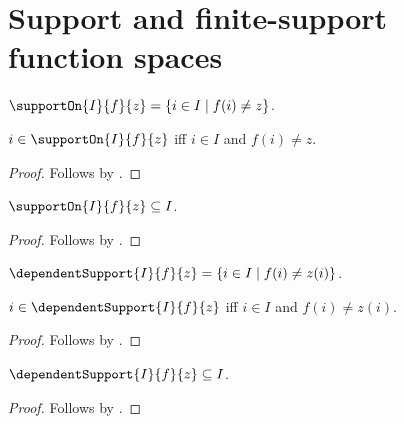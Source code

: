 




\section{Support and finite-support function spaces}

\begin{definition}\label{spike_support_on}
    $\supportOn{I}{f}{z}=\{i\in I\mid f(i)\neq z\}$.
\end{definition}

\begin{proposition}\label{spike_support_on_iff}
    $i\in\supportOn{I}{f}{z}$ iff $i\in I$ and $f(i)\neq z$.
\end{proposition}
\begin{proof}
    Follows by .
\end{proof}

\begin{proposition}\label{spike_support_on_subseteq}
    $\supportOn{I}{f}{z}\subseteq I$.
\end{proposition}
\begin{proof}
    Follows by .
\end{proof}

\begin{definition}\label{spike_dependent_support}
    $\dependentSupport{I}{f}{z}
        =\{i\in I\mid f(i)\neq z(i)\}$.
\end{definition}

\begin{proposition}\label{spike_dependent_support_iff}
    $i\in\dependentSupport{I}{f}{z}$ iff
        $i\in I$ and $f(i)\neq z(i)$.
\end{proposition}
\begin{proof}
    Follows by .
\end{proof}

\begin{proposition}\label{spike_dependent_support_subseteq}
    $\dependentSupport{I}{f}{z}\subseteq I$.
\end{proposition}
\begin{proof}
    Follows by .
\end{proof}

